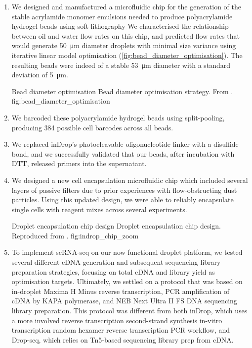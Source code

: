 \begin{enumerate}[noitemsep]
	\item We designed and manufactured a microfluidic chip for the generation of the stable acrylamide monomer emulsions needed to produce polyacrylamide hydrogel beads using soft lithography We characterised the relationship between oil and water flow rates on this chip, and predicted flow rates that would generate \SI{50}{\micro\metre} diameter droplets with minimal size variance using iterative linear model optimisation (\autoref{fig:bead_diameter_optimisation}). The resulting beads were indeed of a stable \SI{53}{\micro\metre} diameter with a standard deviation of \SI{5}{\micro\metre}.

	      {Bead diameter optimisation}
	      {Bead diameter optimisation strategy. From .}
	      {fig:bead_diameter_optimisation}

	\item We barcoded these polyacrylamide hydrogel beads using split-pooling, producing 384  possible cell barcodes across all beads.

	\item We replaced inDrop's photocleavable oligonucleotide linker with a disulfide bond, and we successfully validated that our beads, after incubation with DTT, released primers into the supernatant.

	\item We designed a new cell encapsulation microfluidic chip which included several layers of passive filters due to prior experiences with flow-obstructing dust particles. Using this updated design, we were able to reliably encapsulate single cells with reagent mixes across several experiments.

		      {\def\svgwidth{0.65\textwidth}%
			      {Droplet encapsulation chip design}
			      {Droplet encapsulation chip design. Reproduced from .}
			      {fig:indrop_chip_zoom}
		      }

	\item To implement scRNA-seq on our now functional droplet platform, we tested several different cDNA generation and subsequent sequencing library preparation strategies, focusing on total cDNA and library yield as optimisation targets. Ultimately, we settled on a protocol that was based on in-droplet Maxima H Minus reverse transcription, PCR amplification of cDNA by KAPA polymerase, and NEB Next Ultra II FS DNA sequencing library preparation. This protocol was different from both inDrop, which uses a more involved reverse transcription \textrightarrow{} second-strand synthesis \textrightarrow{} in-vitro transcription \textrightarrow{} random hexamer reverse transcription \textrightarrow{} PCR workflow, and Drop-seq, which relies on Tn5-based sequencing library prep from cDNA.
\end{enumerate}

